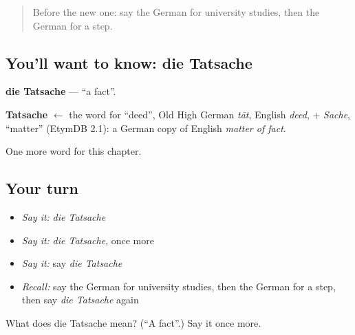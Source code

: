\label{lesson:GE-C239-tatsache}



\begin{quote}
Before the new one: say the German for university studies, then the German for a step.
\end{quote}

\subsection*{You'll want to know: die Tatsache}
\textbf{die Tatsache} — \textquotedblleft{}a fact\textquotedblright{}.

\begin{cousinweb}
\textbf{Tatsache} $\leftarrow$ the word for \textquotedblleft{}deed\textquotedblright{}, Old High German \emph{tāt}, English \emph{deed}, + \emph{Sache}, \textquotedblleft{}matter\textquotedblright{} (EtymDB 2.1): a German copy of English \emph{matter of fact}.
\end{cousinweb}

\begin{grammarlens}[title={What you've built}]
One more word for this chapter.
\end{grammarlens}

\subsection*{Your turn}
\begin{itemize}
\raggedright
  \item \emph{Say it:} \emph{die Tatsache}
  \item \emph{Say it:} \emph{die Tatsache}, once more
  \item \emph{Say it:} say \emph{die Tatsache}
  \item \emph{Recall:} say the German for university studies, then the German for a step, then say \emph{die Tatsache} again
\end{itemize}

\begin{tcolorbox}[breakable,colback=teal!4,colframe=teal!35!black,title={Before you move on}]
What does die Tatsache mean? (\textquotedblleft{}A fact\textquotedblright{}.) Say it once more.
\end{tcolorbox}
